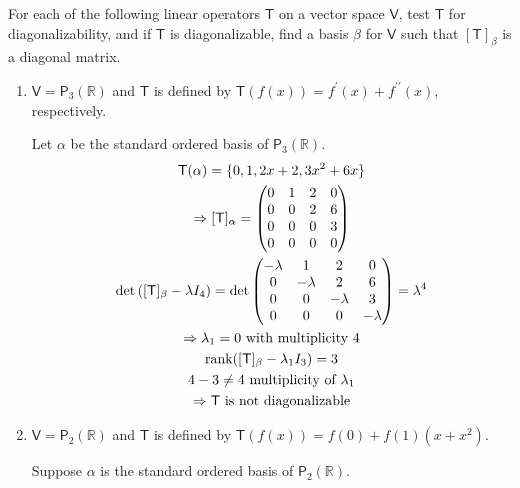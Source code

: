For each of the following linear operators $\mathsf{T}$ on a vector
space $\mathsf{V}$, test $\mathsf{T}$ for diagonalizability, and if
$\mathsf{T}$ is diagonalizable, find a basis $\beta$ for $\mathsf{V}$
such that $[\mathsf{T}]_\beta$ is a diagonal matrix.
\begin{enumerate}
\item $\mathsf{V}=\mathsf{P}_3(\mathbb{R})$ and $\mathsf{T}$ is
  defined by $\mathsf{T}(f(x)) = f^\prime(x) + f^{\prime\prime}(x),$
  respectively.

Let $\alpha$ be the standard ordered basis of
$\mathsf{P}_3(\mathbb{R})$.
\begin{gather}
\mathsf{T}(\alpha) = \{0,1,2x+2,3x^2+6x\}\\
\Rightarrow [\mathsf{T}]_\alpha = \begin{pmatrix}
0 & 1 & 2 & 0\\
0 & 0 & 2 & 6\\
0 & 0 & 0 & 3\\
0 & 0 & 0 & 0
\end{pmatrix}\\
\det{([\mathsf{T}]_\beta -\lambda I_4)} = \det{\begin{pmatrix}
-\lambda & 1 & 2 & 0\\
0 & -\lambda & 2 & 6\\
0 & 0 & -\lambda & 3\\
0 & 0 & 0 & -\lambda
    \end{pmatrix}} = \lambda^4\\
\Rightarrow \lambda_1 = 0 \text{ with multiplicity 4}\\
\text{rank}({[\mathsf{T}]_\beta - \lambda_1I_3}) = 3\\
4-3\neq 4 \text{ multiplicity of } \lambda_1 \\
\notag \Rightarrow \mathsf{T} \text{ is not diagonalizable}
\end{gather}
\setcounter{enumii}{3}
\item $\mathsf{V} = \mathsf{P}_2(\mathbb{R})$ and $\mathsf{T}$ is
  defined by $\mathsf{T}(f(x)) = f(0) +f(1)(x+x^2)$.

Suppose $\alpha$ is the standard ordered basis of
$\mathsf{P}_2(\mathbb{R})$.


\end{enumerate}
